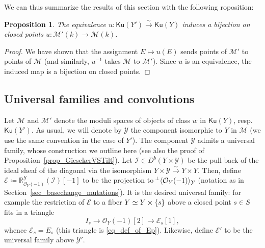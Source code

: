 \documentclass[11pt]{amsart}
\newtheorem{proposition}[thm]{Proposition}
\theoremstyle{definition}
\newcommand{\sO}{\mathcal{O}}
\newcommand{\sY}{\mathcal{Y}}
\newcommand{\sM}{\mathcal{M}}
\newcommand{\sE}{\mathcal{E}}
\DeclarePairedDelimiter{\set}{\lbrace}{\rbrace}
\DeclarePairedDelimiter{\pair}{\langle}{\rangle}
\newcommand{\Ku}{\mathsf{Ku}}
\newcommand{\sI}{\mathcal{I}}
\begin{document}
We can thus summarize the results of this section with the following roposition:

\begin{proposition}\label{map_given_by_equiv}
The equivalence $u \colon \Ku(Y') \xrightarrow{\sim} \Ku(Y)$ induces a bijection on closed points $u\colon \mathcal{M}'(k) \to \mathcal{M}(k)$.
\end{proposition}
\begin{proof} We have shown that the assignment $E\mapsto u(E)$ sends points of $\sM'$ to points of $\sM$ (and similarly, $u^{-1}$ takes $\sM$ to $\sM'$). Since $u$ is an equivalence, the induced map is a bijection on closed points. 
\end{proof}

\subsection{Universal families and convolutions}\label{sec_univ_fam_and_convolutions}
Let $\sM$ and $\sM'$ denote the moduli spaces of objects of class $w$ in $\Ku(Y)$, resp. $\Ku(Y')$. As usual, we will denote by $\mathcal{Y}$ the component isomorphic to $Y$ in $\sM$ (we use the same convention in the case of $Y'$). 
The component $\mathcal Y$ admits a universal family, whose construction we outline here (see also the proof of Proposition~\ref{prop_GiesekerVSTilt}). Let $\sI \in D^b(Y \times \mathcal Y)$ be the pull back of the ideal sheaf of the diagonal via the isomorphism $Y\times \mathcal  Y \xrightarrow{\sim} Y\times Y$. Then, define $\sE\coloneqq \mathbb R_{\sO_Y(-1)}^{\mathcal Y}(\sI)[-1]$ to be the projection to $\!^\perp\pair{\sO_Y(-1)}_\sY$ (notation as in Section~\ref{sec_basechange_mutations}). It is the desired universal family: for example the restriction of $\sE$ to a fiber $Y\simeq Y\times \set{s}$ above a closed point $s\in S$ fits in a triangle
\[ I_s \to \sO_Y(-1)[2] \to \sE_s[1], \]
whence $\sE_s=E_s$ (this triangle is \eqref{eq_def_of_Ep}). Likewise, define $\sE'$ to be the universal family above $\sY'$. 
\end{document}
